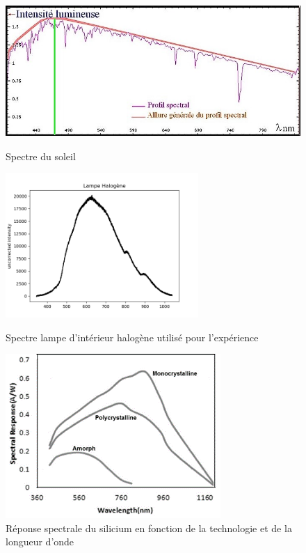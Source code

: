 \documentclass{rapportENS}
\begin{document}
  \begin{figure}[h!]
     \centering
      \begin{minipage}[c]{0.5\linewidth}
      \centering
     \includegraphics[width=0.9\linewidth,height=5cm]{spectre_soleil.jpg}
    \vspace{0.5cm}
     \caption{Spectre du soleil}
    \vspace{0.5cm}
     \label{fig:spectre_soleil}
     \end{minipage}\hfill
      \begin{minipage}[c]{0.5\linewidth}
      \centering
     \includegraphics[width=0.9\linewidth,height=5.5cm]{halogene.png}
    \vspace{0.5cm}
     \caption{Spectre lampe d'intérieur halogène utilisé pour l'expérience}
    \vspace{0.5cm}
     \label{fig:halogène}
     \end{minipage}\hfill
     
 \end{figure}
 
 \begin{figure}[h!]
     \centering
     \includegraphics [scale=1]{silicium.png}
    \vspace{0.5cm}
     \caption{Réponse spectrale du silicium en fonction de la technologie et de la longueur d'onde}
     \label{fig:silicium}
 \end{figure}
\end{document}
